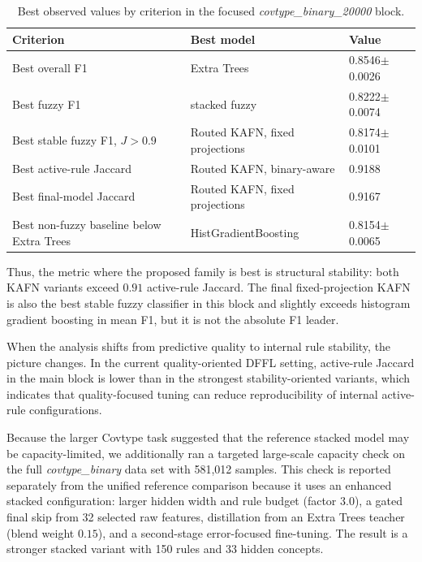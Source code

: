 \documentclass[runningheads]{llncs}
\begin{document}
\begin{table}[H]
\centering
\caption{Best observed values by criterion in the focused \textit{covtype\_binary\_20000} block.}
\label{tab:kafn_best_criteria}
\scriptsize
\setlength{\tabcolsep}{4pt}
\begin{tabular}{lll}
\toprule
Criterion & Best model & Value \\
\midrule
Best overall F1 & Extra Trees & 0.8546$\pm$0.0026 \\
Best fuzzy F1 & stacked fuzzy & 0.8222$\pm$0.0074 \\
Best stable fuzzy F1, $J>0.9$ & Routed KAFN, fixed projections & 0.8174$\pm$0.0101 \\
Best active-rule Jaccard & Routed KAFN, binary-aware & 0.9188 \\
Best final-model Jaccard & Routed KAFN, fixed projections & 0.9167 \\
Best non-fuzzy baseline below Extra Trees & HistGradientBoosting & 0.8154$\pm$0.0065 \\
\bottomrule
\end{tabular}
\end{table}

Thus, the metric where the proposed family is best is structural stability: both KAFN variants exceed $0.91$ active-rule Jaccard. The final fixed-projection KAFN is also the best stable fuzzy classifier in this block and slightly exceeds histogram gradient boosting in mean F1, but it is not the absolute F1 leader.

When the analysis shifts from predictive quality to internal rule stability, the picture changes. In the current quality-oriented DFFL setting, active-rule Jaccard in the main block is lower than in the strongest stability-oriented variants, which indicates that quality-focused tuning can reduce reproducibility of internal active-rule configurations.

Because the larger Covtype task suggested that the reference stacked model may be capacity-limited, we additionally ran a targeted large-scale capacity check on the full \textit{covtype\_binary} data set with 581,012 samples. This check is reported separately from the unified reference comparison because it uses an enhanced stacked configuration: larger hidden width and rule budget (factor $3.0$), a gated final skip from 32 selected raw features, distillation from an Extra Trees teacher (blend weight $0.15$), and a second-stage error-focused fine-tuning. The result is a stronger stacked variant with 150 rules and 33 hidden concepts.
\end{document}
